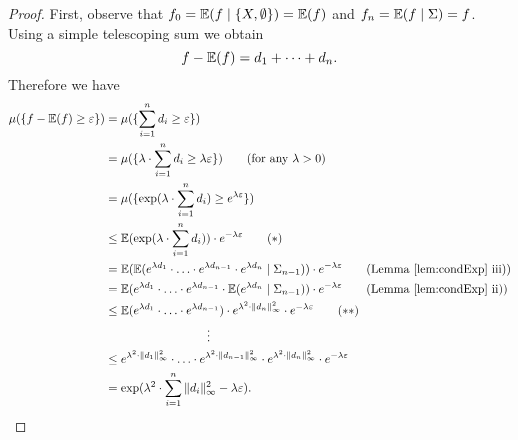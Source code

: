 \begin{proof} First, observe that $f_0=\mathbb{E}(f\mid \{X,\emptyset\})=\mathbb{E}(f)$ and $f_n=\mathbb{E}(f\mid\Sigma)=f$. Using a simple telescoping sum we obtain \[f-\mathbb{E}(f)=d_1+\dots+d_n.\] Therefore we have
	\begin{align*}
		\mu(\{f-\E(f)\geq \varepsilon\}) & =\mu(\{\sum_{i=1}^{n}d_i\geq  \varepsilon\})                                                                                                                            \\
		                                 & =\mu(\{\lambda\cdot\sum_{i=1}^{n}d_i\geq \lambda \varepsilon\})\tag{for any $\lambda>0$}                                                                                \\
		                                 & =\mu(\{\exp({\lambda\cdot\sum_{i=1}^{n}d_i})\geq e^{\lambda \varepsilon}\})                                                                                               \\
		                                 & \leq\E(\exp({\lambda\cdot\sum_{i=1}^{n}d_i}))\cdot e^{-\lambda \varepsilon}\tag{$\ast$}                                                                                 \\
		                                 & =\E(\E(e^{\lambda d_1}\cdot\ldots\cdot e^{\lambda d_{n-1}}\cdot e^{\lambda d_n}\mid \Sigma_{n-1}))\cdot e^{-\lambda \varepsilon}\tag{Lemma \ref{lem:condExp} iii)}            \\
		                                 & =\E(e^{\lambda d_1}\cdot\ldots\cdot e^{\lambda d_{n-1}}\cdot\E(e^{\lambda d_n}\mid \Sigma_{n-1}))\cdot e^{-\lambda \varepsilon}\tag{Lemma \ref{lem:condExp} ii)}            \\
		                                 & \leq\E(e^{\lambda d_1}\cdot\ldots\cdot e^{\lambda d_{n-1}})\cdot e^{\lambda^2\cdot \|d_n\|^2_\infty}\cdot e^{-\lambda \varepsilon}\tag{$\ast\ast$}                      \\
		                                 & \hspace{3cm}\vdots                                                                                                                                                      \\
		                                 & \leq e^{\lambda^2\cdot \|d_1\|^2_\infty}\cdot\ldots\cdot e^{\lambda^2\cdot \|d_{n-1}\|^2_\infty}\cdot e^{\lambda^2\cdot \|d_n\|^2_\infty}\cdot e^{-\lambda \varepsilon} \\
		                                 & =\exp({\lambda^2\cdot\sum_{i=1}^n\|d_i\|^2_\infty-\lambda \varepsilon}).                                                                                                
	\end{align*}
				

\end{proof}
